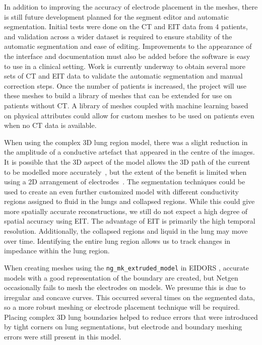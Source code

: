 In addition to improving the accuracy of electrode placement in the meshes,
there is still future development 
planned for the segment editor and automatic segmentation. Initial tests were done on the CT and EIT data
from 4 patients, and validation across a wider dataset is required to ensure stability 
of the automatic segmentation and ease of editing. Improvements to the appearance of the interface and 
documentation must also be added before the software is easy to use in a clinical setting. 
Work is currently underway to obtain several more sets of CT and EIT data to validate the automatic 
segmentation and manual correction steps. Once the number of patients is increased, 
the project will use these meshes to build a library of meshes that can be extended for 
use on patients without CT. A library of meshes coupled with machine learning based on physical 
attributes could allow for custom meshes to be used on patients even when no CT data is available. 

When using the complex 3D lung region model, there was a
slight reduction in the amplitude of a conductive artefact that appeared in the centre of
the images. It is possible that the 3D aspect of the model allows the 3D path of the current
to be modelled more accurately~\parencite{adler_electrical_2017}, but the 
extent of the benefit is limited when using a 2D arrangement of 
electrodes~\parencite{grychtol_3d_2016}. The segmentation techniques could be used to 
create an even further customized model with different conductivity regions assigned to 
fluid in the lungs and collapsed regions. While this could give more spatially accurate 
reconstructions, we still do not expect a high degree of spatial accuracy using EIT. The 
advantage of EIT is primarily the high temporal resolution. Additionally, 
the collapsed regions and liquid in the lung may move over time. Identifying the entire lung 
region allows us to track changes in impedance within the lung region.

When creating meshes using the \verb!ng_mk_extruded_model! in EIDORS \parencite{grychtol_fem_2013}, 
accurate models with a good representation of the boundary are created, but 
Netgen occasionally fails to mesh the electrodes on models. We presume this is 
due to irregular and concave curves.
This occurred several times on the segmented data, so a more robust meshing
or electrode placement technique will be required. Placing complex 3D lung boundaries helped to reduce 
errors that were introduced by tight corners on lung segmentations, but electrode and boundary meshing
errors were still present in this model. 

